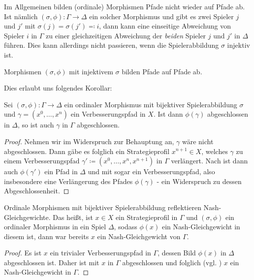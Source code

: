 Im Allgemeinen bilden (ordinale) Morphismen Pfade nicht wieder auf Pfade ab. Ist nämlich $(\sigma, \phi): \Gamma \to \Delta$ ein solcher Morphismus und gibt es zwei Spieler $j$ und $j'$ mit $\sigma(j) = \sigma(j') \eqqcolon i$, dann kann eine einseitige Abweichung von Spieler $i$ in $\Gamma$ zu einer gleichzeitigen Abweichung der \emph{beiden} Spieler $j$ und $j'$ in $\Delta$ führen. Dies kann allerdings nicht passieren, wenn die Spielerabbildung $\sigma$ injektiv ist.

\begin{beob}\label{beob:PfadeAufPfade}
	Morphismen $(\sigma, \phi)$ mit injektivem $\sigma$ bilden Pfade auf Pfade ab.
\end{beob}

Dies erlaubt uns folgendes Korollar:

\begin{kor}\label{kor:ReflAbg}
	Sei $(\sigma, \phi): \Gamma \to \Delta$ ein ordinaler Morphismus mit bijektiver Spielerabbildung $\sigma$ und $\gamma = (x^0, \dots, x^n)$ ein Verbesserungspfad in $X$. Ist dann $\phi(\gamma)$ abgeschlossen in $\Delta$, so ist auch $\gamma$ in $\Gamma$ abgeschlossen.
\end{kor}
	
\begin{proof}	
	Nehmen wir im Widerspruch zur Behauptung an, $\gamma$ wäre nicht abgeschlossen. Dann gäbe es folglich ein Strategieprofil $x^{n+1} \in X$, welches $\gamma$ zu einem Verbesserungspfad $\gamma' \coloneqq (x^0, \dots, x^n, x^{n+1})$ in $\Gamma$ verlängert. Nach  ist dann auch $\phi(\gamma')$ ein Pfad in $\Delta$ und mit  sogar ein Verbesserungspfad, also insbesondere eine Verlängerung des Pfades $\phi(\gamma)$ - ein Widerspruch zu dessen Abgeschlossenheit.
\end{proof}

\begin{kor}\label{kor:ReflektNG}
	Ordinale Morphismen mit bijektiver Spielerabbildung reflektieren Nash-Gleichgewichte. Das heißt, ist $x \in X$ ein Strategieprofil in $\Gamma$ und $(\sigma, \phi)$ ein ordinaler Morphismus in ein Spiel $\Delta$, sodass $\phi(x)$ ein Nash-Gleichgewicht in diesem ist, dann war bereits $x$ ein Nash-Gleichgewicht von $\Gamma$.
\end{kor}

\begin{proof}
	Es ist $x$ ein trivialer Verbesserungspfad in $\Gamma$, dessen Bild $\phi(x)$ in $\Delta$ abgeschlossen ist. Daher ist mit  $x$ in $\Gamma$ abgeschlossen und folglich (vgl. ) $x$ ein Nash-Gleichgewicht in $\Gamma$.
\end{proof}

